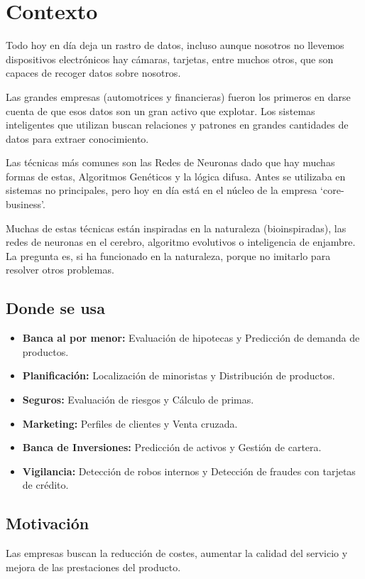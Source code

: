 \documentclass[12pt, twoside, openright]{report} %
\begin{document}
\section{Contexto}
Todo hoy en día deja un rastro de datos, incluso aunque nosotros no llevemos dispositivos electrónicos hay cámaras, tarjetas, entre muchos otros, que son capaces de recoger datos sobre nosotros.

Las grandes empresas (automotrices y financieras) fueron los primeros en darse cuenta de que esos datos son un gran activo que explotar. Los sistemas inteligentes que utilizan buscan relaciones y patrones en grandes cantidades de datos para extraer conocimiento.

Las técnicas más comunes son las Redes de Neuronas dado que hay muchas formas de estas, Algoritmos Genéticos y la lógica difusa. Antes se utilizaba en sistemas no principales, pero hoy en día está en el núcleo de la empresa ‘core-business’.

Muchas de estas técnicas están inspiradas en la naturaleza (bioinspiradas), las redes de neuronas en el cerebro, algoritmo evolutivos o inteligencia de enjambre. La pregunta es, si ha funcionado en la naturaleza, porque no imitarlo para resolver otros problemas.

\subsection{Donde se usa}
\begin{itemize}
	\item \textbf{Banca al por menor:} Evaluación de hipotecas y Predicción de demanda de productos.
	\item \textbf{Planificación:} Localización de minoristas y Distribución de productos.
	\item \textbf{Seguros:} Evaluación de riesgos y Cálculo de primas.
	\item \textbf{Marketing:} Perfiles de clientes y Venta cruzada.
	\item \textbf{Banca de Inversiones:} Predicción de activos y Gestión de cartera.
	\item \textbf{Vigilancia:} Detección de robos internos y Detección de fraudes con tarjetas de crédito.
\end{itemize}

\subsection{Motivación}
Las empresas buscan la reducción de costes, aumentar la calidad del servicio y mejora de las prestaciones del producto.
\end{document}
